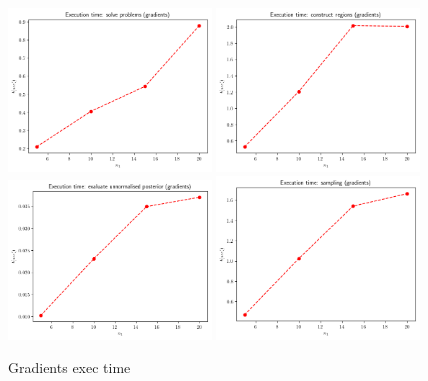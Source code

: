 \begin{figure}[h]
    \begin{center}
      \includegraphics[width=0.48\textwidth]{./Thesis/images/chapter4/exec_solve_gradients.png}
      \includegraphics[width=0.48\textwidth]{./Thesis/images/chapter4/exec_regions_gradients.png}\\
      \includegraphics[width=0.48\textwidth]{./Thesis/images/chapter4/exec_posterior_gradients.png}
      \includegraphics[width=0.48\textwidth]{./Thesis/images/chapter4/exec_sample_gradients.png}      
    \end{center}
    \caption{Gradients exec time}
  \label{fig:exec_gradients}
\end{figure}


